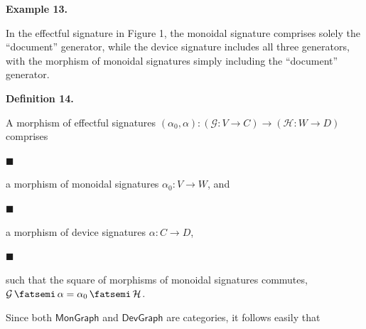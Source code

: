 \documentclass[10pt,a4paper]{article}
\begin{document}
 
\par\medskip\noindent\textbf{Example 13.}\par
 
 
In the effectful signature in Figure 1, the monoidal signature comprises solely the “document” generator, while the device signature includes all three generators, with the morphism of monoidal signatures simply including the “document” generator.\par
 
 
 
 
\par\medskip\noindent\textbf{Definition 14.}\par
 
 
A morphism of effectful signatures $(\alpha_{0},\alpha):(\mathcal{G}:V\to C)\to(\mathcal{H}:W\to D)$ comprises\par
  
\par\noindent  $\blacksquare$ 
 
a morphism of monoidal signatures $\alpha_{0}:V\to W$, and\par
 
 
 
\par\noindent  $\blacksquare$ 
 
a morphism of device signatures $\alpha:C\to D$,\par
 
 
 
\par\noindent  $\blacksquare$ 
 
such that the square of morphisms of monoidal signatures commutes, $\mathcal{G}\mathop{\fatsemi}\alpha=\alpha_{0}\mathop{\fatsemi}\mathcal{H}$.\par
 
 
  
 
 
 
Since both $\mathsf{MonGraph}$ and $\mathsf{DevGraph}$ are categories, it follows easily that\par
 
\end{document}
